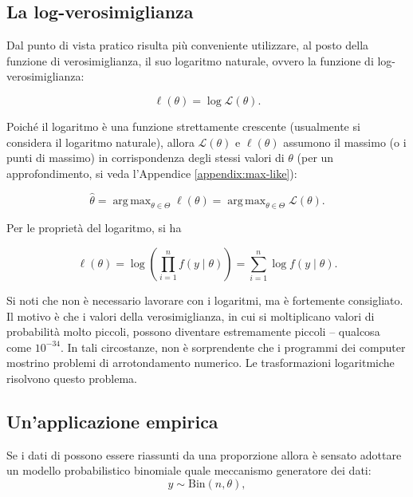 \documentclass[
  11pt,
]{krantz}
\DeclareMathOperator{\argmax}{arg\,max}
\theoremstyle{definition}
\theoremstyle{definition}
\theoremstyle{definition}
\theoremstyle{definition}
\theoremstyle{remark}
\begin{document}
\hypertarget{la-log-verosimiglianza}{%
\subsection{La log-verosimiglianza}\label{la-log-verosimiglianza}}

Dal punto di vista pratico risulta più conveniente utilizzare, al posto della funzione di verosimiglianza, il suo logaritmo naturale, ovvero la funzione di log-verosimiglianza:

\begin{equation}
\ell(\theta) = \log \mathcal{L}(\theta).
\end{equation}

Poiché il logaritmo è una funzione strettamente crescente (usualmente si considera il logaritmo naturale), allora \(\mathcal{L}(\theta)\) e \(\ell(\theta)\) assumono il massimo (o i punti di massimo) in corrispondenza degli stessi valori di \(\theta\) (per un approfondimento, si veda l'Appendice \ref{appendix:max-like}):

\[
\hat{\theta} = \argmax_{\theta \in \Theta} \ell(\theta) = \argmax_{\theta \in \Theta} \mathcal{L}(\theta).
\]

Per le proprietà del logaritmo, si ha

\begin{equation}
\ell(\theta) = \log \left( \prod_{i = 1}^n f(y \mid \theta) \right) = \sum_{i = 1}^n \log f(y \mid \theta).
\end{equation}

Si noti che non è necessario lavorare con i logaritmi, ma è fortemente consigliato. Il motivo è che i valori della verosimiglianza, in cui si moltiplicano valori di probabilità molto piccoli, possono diventare estremamente piccoli -- qualcosa come \(10^{-34}\). In tali circostanze, non è sorprendente che i programmi dei computer mostrino problemi di arrotondamento numerico. Le trasformazioni logaritmiche risolvono questo problema.

\hypertarget{unapplicazione-empirica-1}{%
\subsection{Un'applicazione empirica}\label{unapplicazione-empirica-1}}

Se i dati di \citet{zetschefuture2019} possono essere riassunti da una proporzione allora è sensato adottare un modello probabilistico binomiale quale meccanismo generatore dei dati: \begin{equation}
y  \sim \mbox{Bin}(n, \theta),
\label{eq:binomialmodel}
\end{equation}
\end{document}
